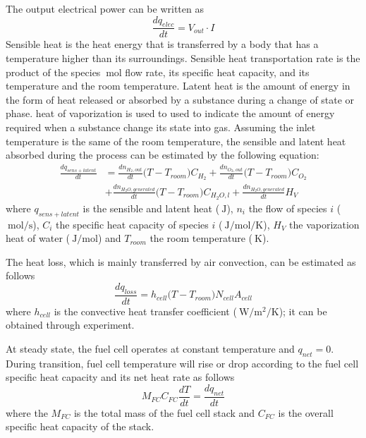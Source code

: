 \documentclass[11pt,a4paper]{article}
\numberwithin{equation}{section}
\theoremstyle{it}
\theoremstyle{definition}
\begin{document}
\begin{enumerate}
The output electrical power can be written as
\begin{equation}\label{eq41}
	\frac{dq_{elec}}{dt} = V_{out}\cdot I
\end{equation}
Sensible heat is the heat energy that is transferred by a body that has a temperature higher than its surroundings. Sensible heat transportation rate is the product of the species $\SI{}{\mole}$ flow rate, its specific heat capacity, and its temperature and the room temperature. Latent heat is the amount of energy in the form of heat released or absorbed by a substance during a change of state or phase. heat of vaporization is used to used to indicate the amount of energy required when a substance change its state into gas. Assuming the inlet temperature is the same of the room temperature, the sensible and latent heat absorbed during the process can be estimated by the following equation:
\begin{equation}\label{eq42}
	\begin{aligned}
	\frac{dq_{sens+latent}}{dt} &= \frac{dn_{H_2,out}}{dt}\Big(T-T_{room}\Big)C_{H_2}+\frac{dn_{O_2,out}}{dt}\Big(T-T_{room}\Big)C_{O_2}\\[6pt] &+\frac{dn_{H_2O,generated}}{dt}\Big(T-T_{room}\Big)C_{H_2O,l}+\frac{dn_{H_2O,generated}}{dt}H_V
	\end{aligned}
\end{equation}
where $q_{sens+latent}$ is the sensible and latent heat ($\SI{}{\joule}$), $n_i$ the flow of species $i$ ($\SI{}{\mole\per\second}$), $C_i$ the specific heat capacity of species $i$ ($\SI{}{\joule\per\mole\per\kelvin}$), $H_V$ the vaporization heat of water ($\SI{}{\joule\per\mole}$) and $T_{room}$ the room temperature ($\SI{}{\kelvin}$). 

The heat loss, which is mainly transferred by air convection, can be estimated as follows
\begin{equation}\label{eq43}
	\frac{dq_{loss}}{dt} = h_{cell}\Big(T-T_{room}\Big)N_{cell}A_{cell}
\end{equation}
where $h_{cell}$ is the convective heat transfer coefficient ($\SI{}{\watt\per\square\meter\per\kelvin}$); it can be obtained through experiment.

At steady state, the fuel cell operates at constant temperature and $q_{net}=0$. During transition, fuel cell temperature will rise or drop according to the fuel cell specific heat capacity and its net heat rate as follows
\begin{equation}\label{eq44}
	M_{FC}C_{FC}\frac{dT}{dt}=\frac{dq_{net}}{dt}
\end{equation}
where the $M_{FC}$ is the total mass of the fuel cell stack and $C_{FC}$ is the overall specific heat capacity of the stack.
\end{enumerate}
\end{document}
